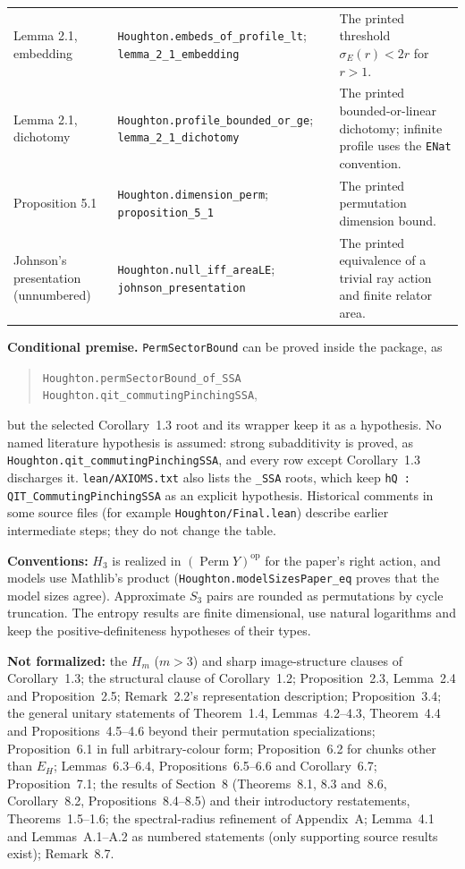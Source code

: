 \documentclass[11pt,a4paper]{article}
\theoremstyle{plain}
\theoremstyle{definition}
\theoremstyle{remark}
\begin{document}
\begin{longtable}{@{}>{\raggedright\arraybackslash}p{}>{\raggedright\arraybackslash}p{}>{\raggedright\arraybackslash}p{}@{}}
Lemma 2.1, embedding & \nolinkurl{Houghton.embeds_of_profile_lt}; \nolinkurl{lemma_2_1_embedding} & The printed threshold $\sigma_E(r)<2r$ for $r>1$. \\
Lemma 2.1, dichotomy & \nolinkurl{Houghton.profile_bounded_or_ge}; \nolinkurl{lemma_2_1_dichotomy} & The printed bounded-or-linear dichotomy; infinite profile uses the \nolinkurl{ENat} convention. \\
Proposition 5.1 & \nolinkurl{Houghton.dimension_perm}; \nolinkurl{proposition_5_1} & The printed permutation dimension bound. \\
Johnson's presentation (unnumbered) & \nolinkurl{Houghton.null_iff_areaLE}; \nolinkurl{johnson_presentation} & The printed equivalence of a trivial ray action and finite relator area. \\
\bottomrule
\end{longtable}
\endgroup

\noindent\textbf{Conditional premise.} \nolinkurl{PermSectorBound} can be
proved inside the package, as
\begin{quote}\small
\nolinkurl{Houghton.permSectorBound_of_SSA}
\nolinkurl{Houghton.qit_commutingPinchingSSA},
\end{quote}
but the selected Corollary~1.3 root and its wrapper keep it as a hypothesis.
No named literature hypothesis is assumed: strong subadditivity is proved, as
\nolinkurl{Houghton.qit_commutingPinchingSSA}, and every row except Corollary~1.3
discharges it. \nolinkurl{lean/AXIOMS.txt} also lists the \texttt{\_SSA} roots, which
keep \nolinkurl{hQ : QIT_CommutingPinchingSSA} as an explicit hypothesis.
Historical comments in some source files (for example
\nolinkurl{Houghton/Final.lean}) describe earlier intermediate steps; they do
not change the table.

\noindent\textbf{Conventions:} $H_3$ is realized in
$(\operatorname{Perm}Y)^{\mathrm{op}}$ for the paper's right action, and models
use Mathlib's product (\nolinkurl{Houghton.modelSizesPaper_eq} proves that the
model sizes agree). Approximate $S_3$ pairs are rounded as permutations by
cycle truncation. The entropy results are finite dimensional, use natural
logarithms and keep the positive-definiteness hypotheses of their types.

\noindent\textbf{Not formalized:} the $H_m$ ($m>3$) and sharp
image-structure clauses of Corollary~1.3; the structural clause of
Corollary~1.2; Proposition~2.3, Lemma~2.4 and Proposition~2.5; Remark~2.2's
representation description; Proposition~3.4; the general unitary statements
of Theorem~1.4, Lemmas~4.2--4.3, Theorem~4.4 and Propositions~4.5--4.6 beyond
their permutation specializations; Proposition~6.1 in full arbitrary-colour
form; Proposition~6.2 for chunks other than $E_H$; Lemmas~6.3--6.4,
Propositions~6.5--6.6 and Corollary~6.7; Proposition~7.1; the results of
Section~8 (Theorems~8.1, 8.3 and~8.6, Corollary~8.2, Propositions~8.4--8.5)
and their introductory restatements, Theorems~1.5--1.6; the spectral-radius
refinement of Appendix~A; Lemma~4.1 and Lemmas~A.1--A.2 as numbered
statements (only supporting source results exist); Remark~8.7.
\end{document}
